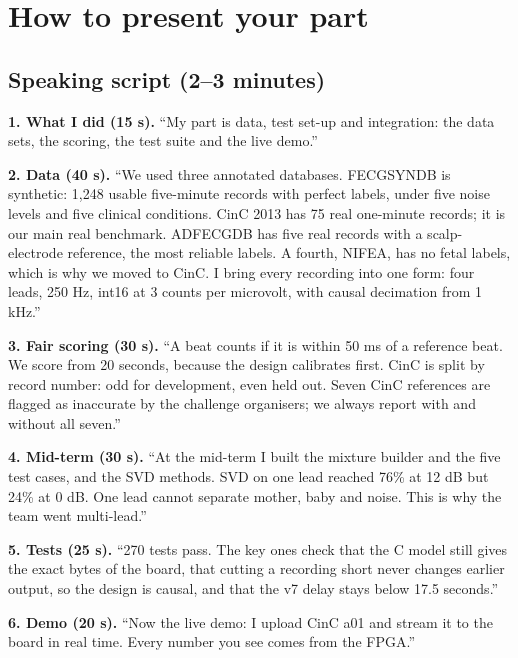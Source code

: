 \documentclass[11pt]{article}
\begin{document}
\section{How to present your part}

\subsection{Speaking script (2--3 minutes)}

\begin{simple}[Script]
\textbf{1. What I did (15 s).} ``My part is data, test set-up and integration: the data sets, the scoring, the test suite and the live demo.''

\textbf{2. Data (40 s).} ``We used three annotated databases. FECGSYNDB is synthetic: 1,248 usable five-minute records with perfect labels, under five noise levels and five clinical conditions. CinC 2013 has 75 real one-minute records; it is our main real benchmark. ADFECGDB has five real records with a scalp-electrode reference, the most reliable labels. A fourth, NIFEA, has no fetal labels, which is why we moved to CinC. I bring every recording into one form: four leads, 250 Hz, int16 at 3 counts per microvolt, with causal decimation from 1 kHz.''

\textbf{3. Fair scoring (30 s).} ``A beat counts if it is within 50 ms of a reference beat. We score from 20 seconds, because the design calibrates first. CinC is split by record number: odd for development, even held out. Seven CinC references are flagged as inaccurate by the challenge organisers; we always report with and without all seven.''

\textbf{4. Mid-term (30 s).} ``At the mid-term I built the mixture builder and the five test cases, and the SVD methods. SVD on one lead reached 76\% at 12 dB but 24\% at 0 dB. One lead cannot separate mother, baby and noise. This is why the team went multi-lead.''

\textbf{5. Tests (25 s).} ``270 tests pass. The key ones check that the C model still gives the exact bytes of the board, that cutting a recording short never changes earlier output, so the design is causal, and that the v7 delay stays below 17.5 seconds.''

\textbf{6. Demo (20 s).} ``Now the live demo: I upload CinC a01 and stream it to the board in real time. Every number you see comes from the FPGA.''
\end{simple}
\end{document}
